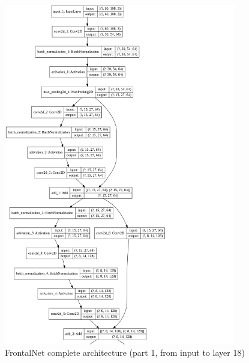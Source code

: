 \begin{figure}[!h]
	\centering
	\includegraphics[width=0.9\textwidth]{"contents/images/03-frontalnet-3A"}
	\caption[FrontalNet complete architecture (part 1)]{FrontalNet complete architecture (part 1, from input to layer 18)}
	\label{fig:frontalnet-architecture-3a}
\end{figure}

